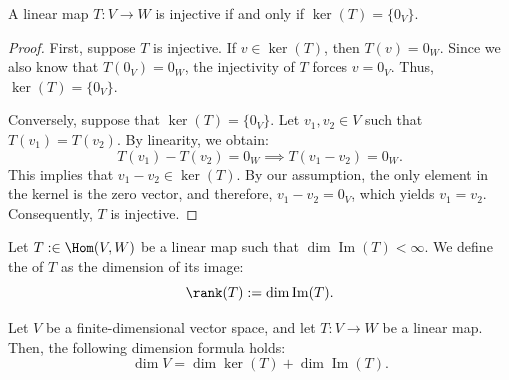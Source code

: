 \begin{proposition}
\label{prop:injectivity_kernel}
A linear map $T: V \to W$ is injective if and only if $\ker(T) = \{0_V\}$.
\end{proposition}

\begin{proof}
First, suppose $T$ is injective. If $v \in \ker(T)$, then $T(v) = 0_W$. Since we also know that $T(0_V) = 0_W$, the injectivity of $T$ forces $v = 0_V$. Thus, $\ker(T) = \{0_V\}$.

Conversely, suppose that $\ker(T) = \{0_V\}$. Let $v_1, v_2 \in V$ such that $T(v_1) = T(v_2)$. By linearity, we obtain:
\[
T(v_1) - T(v_2) = 0_W \implies T(v_1 - v_2) = 0_W.
\]
This implies that $v_1 - v_2 \in \ker(T)$. By our assumption, the only element in the kernel is the zero vector, and therefore, $v_1 - v_2 = 0_V$, which yields $v_1 = v_2$. Consequently, $T$ is injective.
\end{proof}

\begin{definition}
\label{def:rank_linear_map}
Let $T: \in \Hom(V, W)$ be a linear map such that $\dim \operatorname{Im}(T) < \infty$. We define the  of $T$ as the dimension of its image:
\[
\rank(T) := \dim \operatorname{Im}(T).
\]
\end{definition}

\begin{theorem}
\label{thm:rank_nullity}
Let $V$ be a finite-dimensional vector space, and let $T: V \to W$ be a linear map. Then, the following dimension formula holds:
\[
\dim V = \dim \ker(T) + \dim \operatorname{Im}(T).
\]
\end{theorem}

